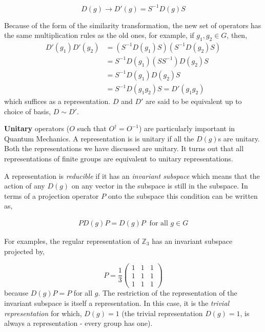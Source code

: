 \begin{equation}
    D(g)\rightarrow D'(g) = S^{-1}D(g)S
\end{equation}

Because of the form of the similarity transformation, the new set of operators has the same multiplication rules as the old ones, for example, if $g_1, g_2\in G$, then, 
\begin{equation}
\begin{split}
    D'(g_1)D'(g_2) &= (S^{-1}D(g_1)S)(S^{-1}D(g_2)S) \\
    &=S^{-1}D(g_1)(SS^{-1})D(g_2)S\\
    &=S^{-1}D(g_1)D(g_2)S\\
    &=S^{-1}D(g_1g_2)S = D'(g_1g_2)
\end{split}
\end{equation}
which suffices as a representation. $D$ and $D'$ are said to be equivalent up to choice of basis, $D\sim{} D'$. 

\textbf{Unitary} operators ($O$ such that $O^{\dagger} = O^{-1}$) are particularly important in Quantum Mechanics. A representation is is unitary if all the $D(g)$s are unitary. Both the representations we have discussed are unitary. It turns out that all representations of finite groups are equivalent to unitary representations. 

A representation is \textit{reducible} if it has an \textit{invariant subspace} which means that the action of any $D(g)$ on any vector in the subspace is still in the subspace. In terms of a projection operator $P$ onto the subspace this condition can be written as, 

\begin{eqnarray}
    PD(g)P = D(g)P \ \text{ for all } g\in G
\end{eqnarray}

For examples, the regular representation of $\mathbb{Z}_3$ has an invariant subspace projected by,

\begin{equation}
    P = \frac{1}{3} \begin{pmatrix}
        1 & 1 & 1\\
        1 & 1 & 1\\
        1 & 1 & 1
    \end{pmatrix}
\end{equation}
because $D(g)P = P$ for all $g$. The restriction of the representation of the invariant subspace is itself a representation. In this case, it is the \textit{trivial representation} for which, $D(g)=1$ (the trivial representation $D(g)=1$, is always a representation - every group has one).


